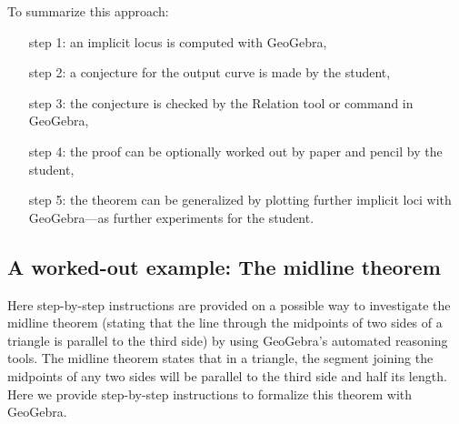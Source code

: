 \documentclass{article}
\begin{document}
To summarize this approach:
\begin{enumerate}
    \item[step 1:] an implicit locus is computed with GeoGebra,
    \item[step 2:] a conjecture for the output curve is made by the student,
    \item[step 3:] the conjecture is checked by the Relation tool or command in GeoGebra,
    \item[step 4:] the proof can be optionally worked out by paper and pencil by the student,
    \item[step 5:] the theorem can be generalized by plotting further implicit loci with GeoGebra---as further experiments for the student.
\end{enumerate}

\subsection{A worked-out example: The midline theorem}

Here step-by-step instructions are provided on a possible way to investigate the midline theorem  (stating that the line through the midpoints of two sides of a triangle is parallel to the third side) by using GeoGebra's automated reasoning tools.
The midline theorem states that in a triangle,
the segment joining the midpoints of any two sides will be parallel to the third side and half its length.
Here we provide step-by-step instructions to formalize this theorem with GeoGebra.
\end{document}
